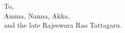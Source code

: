 
\thispagestyle{empty}
\vspace*{0pt plus 2fill}
{\centering
 \textsf{To,} \\
 \textsf{Amma, Nanna, Akka,\\
 \hspace*{11em} and the late Rajeswara Rao Tattagaru.}
}
\vspace*{0pt plus 3fill}






